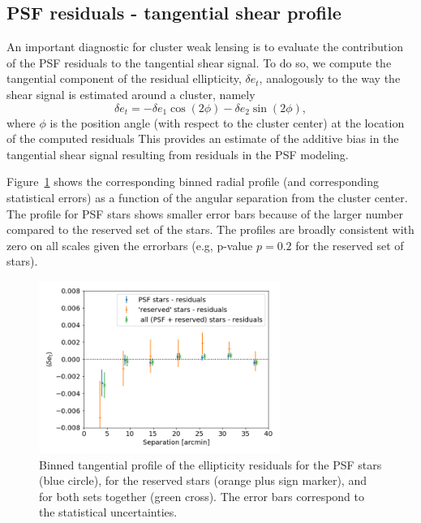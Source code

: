\documentclass[SE,lsstdraft,authoryear,toc]{lsstdoc}
\begin{document}
\subsection{PSF residuals - tangential shear profile}

An important diagnostic for cluster weak lensing is to evaluate the contribution of the PSF residuals to the tangential shear signal. To do so, we compute the tangential component of the residual ellipticity, $\delta e_t$, analogously to the way the shear signal is estimated around a cluster, namely 
\begin{equation}
\delta e_t = - \delta e_1  \cos(2 \phi) - \delta e_2  \sin(2 \phi),
\end{equation}
where $\phi$ is the position angle (with respect to the cluster center) at the location of the computed residuals%
This provides an estimate of the additive bias in the tangential shear signal resulting from residuals in the PSF modeling.

Figure~{\ref{fig:res_profile}} shows the corresponding binned radial profile (and corresponding statistical errors) as a function of the angular separation from the cluster center. The profile for PSF stars shows smaller error bars because of the larger number compared to the reserved set of the stars. The profiles are broadly consistent with zero on all scales given the errorbars (e.g, p-value $p=0.2$ for the reserved set of stars). 

\begin{figure}
\centering
\includegraphics[width=0.7\textwidth]{Figures/residual_tan_profile_CLMM.png}
\caption{Binned tangential profile of the ellipticity residuals for the PSF stars (blue circle), for the reserved stars (orange plus sign marker), and for both sets together (green cross). The error bars correspond to the statistical uncertainties.\label{fig:res_profile}}
\end{figure}
\end{document}
